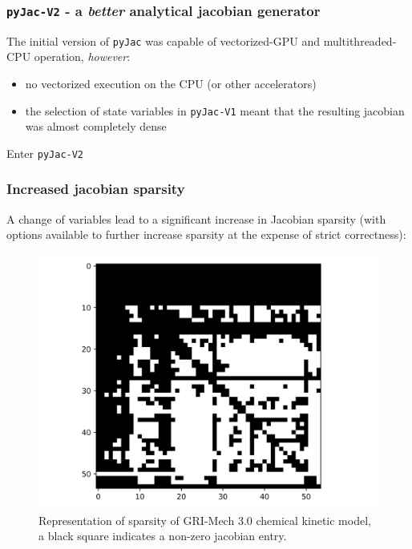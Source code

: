 \documentclass{beamer}
\begin{document}
\begin{frame}
 \frametitle{\texttt{pyJac-V2} - a \textit{better} analytical jacobian generator}
 The initial version of \texttt{pyJac} was capable of vectorized-GPU and multithreaded-CPU operation, \textit{however}:
 \begin{itemize}
  \item no vectorized execution on the CPU (or other accelerators)
  \item the selection of state variables in \texttt{pyJac-V1} meant that the resulting jacobian was almost completely dense
 \end{itemize}
 \textrightarrow Enter \texttt{pyJac-V2}
\end{frame}

\begin{frame}
\frametitle{Increased jacobian sparsity}
A change of variables lead to a significant increase in Jacobian sparsity (with options available to further increase sparsity at the expense of strict correctness):
\begin{figure}
\begin{measuredfigure}
 \includegraphics[height=0.5\textheight]{ch4_sparsity_exact.png}
 \caption{Representation of sparsity of GRI-Mech 3.0 chemical kinetic model, a black square indicates a non-zero jacobian entry.}
 
\end{measuredfigure}
\end{figure}
\end{frame}
\end{document}
